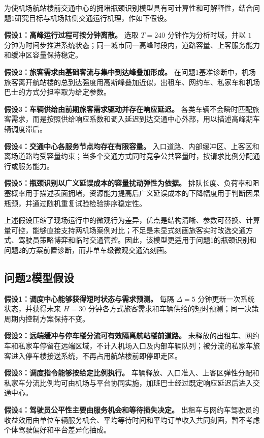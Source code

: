\documentclass[UTF8,a4paper,11pt,onecolumn,fontset=none]{ctexart}
\begin{document}
为使机场航站楼前交通中心的拥堵瓶颈识别模型具有可计算性和可解释性，结合问题1研究目标与机场陆侧交通运行机理，作如下假设。

\textbf{假设1：高峰运行过程可按分钟离散。} 选取 $T=240$ 分钟作为分析时域，并以 $1$ 分钟为时间步推进系统状态；同一城市同一高峰时段内，道路容量、上客服务能力和缓冲区容量保持稳定。

\textbf{假设2：旅客需求由基础客流与集中到达峰叠加形成。} 在问题1基准诊断中，机场旅客离开航站楼的总到达强度用高斯峰叠加近似，出租车、网约车、私家车和机场巴士的方式分担率取为给定参数。

\textbf{假设3：车辆供给由前期旅客需求驱动并存在响应延迟。} 各类车辆不会瞬时匹配旅客需求，而是按照供给响应系数和调入延迟到达交通中心外部，用以描述高峰期车辆调度滞后。

\textbf{假设4：交通中心各服务节点均存在有限容量。} 入口道路、内部缓冲区、上客区和离场道路均受容量约束；当多个交通方式同时竞争公共容量时，按请求比例分配通行或服务能力。

\textbf{假设5：瓶颈识别以广义延误成本的容量扰动弹性为依据。} 排队长度、负荷率和阻塞概率用于描述表面拥堵，资源能力提高后广义延误成本的下降幅度用于判断因果瓶颈，并通过随机重复试验检验排序稳定性。

上述假设压缩了现场运行中的微观行为差异，优点是结构清晰、参数可替换、计算量可控，能够直接支持两机场案例对比；不足是未显式刻画旅客实时改选交通方式、驾驶员策略博弈和临时交通管控。因此，该模型更适用于问题1的瓶颈识别和问题2的方案前置诊断，而非单车级微观交通流刻画。

\subsection{问题2模型假设}

\textbf{假设1：调度中心能够获得短时状态与需求预测。} 每隔 $\Delta=5$ 分钟更新一次系统状态，并获得未来 $H=30$ 分钟各方式旅客需求和车辆供给的短时预测；同一决策周期内控制方案保持不变。

\textbf{假设2：远端缓冲与停车楼分流可有效隔离航站楼前道路。} 未释放的出租车、网约车和私家车停留在远端区域，不计入机场入口及内部车辆队列；被分流的私家车旅客进入停车楼接送系统，不再占用航站楼前即停即走区。

\textbf{假设3：调度指令能够按给定比例执行。} 车辆释放、入口准入、上客区弹性分配和私家车分流比例均可由机场与平台协同实施，加班巴士经过既定响应延迟后进入交通中心。

\textbf{假设4：驾驶员公平性主要由服务机会和等待损失决定。} 出租车与网约车驾驶员的收益效用由单位车辆服务机会、平均等待时间和平均订单收入共同刻画，暂不考虑个体驾驶偏好和平台差异化抽成。
\end{document}
